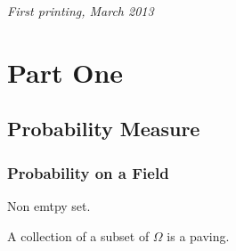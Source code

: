 \documentclass[11pt,fleqn]{book} %
\begin{document}
\noindent \textit{First printing, March 2013} %



\pagestyle{empty} %

\tableofcontents %

\cleardoublepage %

\pagestyle{fancy} %


\part{Part One}



\chapter{Probability Measure}

\section{Probability on a Field}

\begin{definition}[$\Omega$] Non emtpy set. 
	
\end{definition}

\begin{definition}[Paving] A collection of a subset of $\Omega$ is a paving. 
	
\end{definition}
\end{document}
